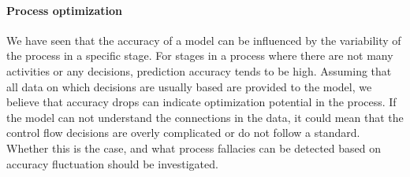 \paragraph{Process optimization} We have seen that the accuracy of a model can be influenced by the variability of the process in a specific stage.
For stages in a process where there are not many activities or any decisions, prediction accuracy tends to be high.
Assuming that all data on which decisions are usually based are provided to the model, we believe that accuracy drops can indicate optimization potential in the process.
If the model can not understand the connections in the data, it could mean that the control flow decisions are overly complicated or do not follow a standard.
Whether this is the case, and what process fallacies can be detected based on accuracy fluctuation should be investigated.
